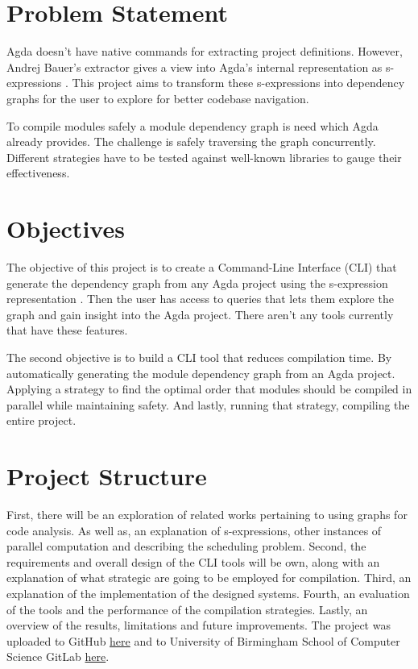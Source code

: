 \section{Problem Statement}

Agda doesn't have native commands for extracting project definitions. However,
Andrej Bauer's extractor gives a view into Agda's internal representation as
s-expressions \cite{andrej}. This project aims to transform these s-expressions
into dependency graphs for the user to explore for better codebase navigation.

To compile modules safely a module dependency graph is need which Agda already
provides. The challenge is safely traversing the graph concurrently. Different
strategies have to be tested against well-known libraries to gauge their
effectiveness. 

\section{Objectives}

The objective of this project is to create a Command-Line Interface (CLI) that
generate the dependency graph from any Agda project using the s-expression
representation \cite{andrej}. Then the user has access to queries that lets
them explore the graph and gain insight into the Agda project. There aren't any
tools currently that have these features. 

The second objective is to build a CLI tool that reduces compilation time. By
automatically generating the module dependency graph from an Agda project.
Applying a strategy to find the optimal order that modules should be compiled
in parallel while maintaining safety. And lastly, running that strategy,
compiling the entire project.

\section{Project Structure}

First, there will be an exploration of related works pertaining to using graphs
for code analysis. As well as, an explanation of s-expressions, other instances
of parallel computation and describing the scheduling problem. Second, the
requirements and overall design of the CLI tools will be own, along with an
explanation of what strategic are going to be employed for compilation. Third,
an explanation of the implementation of the designed systems. Fourth, an
evaluation of the tools and the performance of the compilation strategies.
Lastly, an overview of the results, limitations and future improvements. The
project was uploaded to GitHub
\href{https://github.com/JulianVidal/AGDA_HTML}{here}  and to University of
Birmingham School of Computer Science GitLab
\href{https://git.cs.bham.ac.uk/projects-2024-25/jcv116}{here}.
